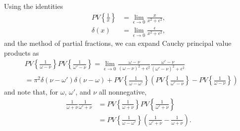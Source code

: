 Using the identities
\begin{equation}
\begin{split}
PV\left\{\frac{1}{x}\right\} &= \lim_{\epsilon\to0}\frac{x}{x^2 + \epsilon^2},\\
\delta(x) &= \lim_{\epsilon\to0}\frac{\epsilon}{x^2 + \epsilon^2},
\end{split}
\end{equation}
and the method of partial fractions, we can expand Cauchy principal value products as
\begin{equation}
\begin{split}
&PV\left\{\frac{1}{\omega - \nu}\right\}PV\left\{\frac{1}{\omega' - \nu}\right\} = \lim_{\epsilon\to0}\frac{\omega - \nu}{(\omega - \nu)^2 + \epsilon^2}\frac{\omega' - \nu}{(\omega' - \nu)^2 + \epsilon^2}\\
&= \pi^2\delta(\nu - \omega')\delta(\nu - \omega) + PV\left\{\frac{1}{\omega - \omega'}\right\}\left(PV\left\{\frac{1}{\omega' - \nu}\right\} - PV\left\{\frac{1}{\omega - \nu}\right\}\right)
\end{split}
\end{equation}
and note that, for $\omega$, $\omega'$, and $\nu$ all nonnegative,
\begin{equation}
\begin{split}
\frac{1}{\omega + \nu}\frac{1}{\omega' + \nu} &= PV\left\{\frac{1}{\omega + \nu}\right\}PV\left\{\frac{1}{\omega' + \nu}\right\}\\
&= PV\left\{\frac{1}{\omega - \omega'}\right\}\left(\frac{1}{\omega' + \nu} - \frac{1}{\omega + \nu}\right).
\end{split}
\end{equation} 
